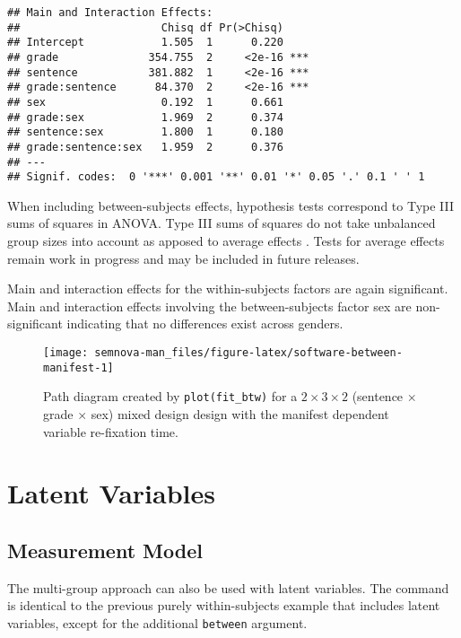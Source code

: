 \documentclass[
]{book}
\begin{document}
\begin{verbatim}
## Main and Interaction Effects:
##                      Chisq df Pr(>Chisq)    
## Intercept            1.505  1      0.220    
## grade              354.755  2     <2e-16 ***
## sentence           381.882  1     <2e-16 ***
## grade:sentence      84.370  2     <2e-16 ***
## sex                  0.192  1      0.661    
## grade:sex            1.969  2      0.374    
## sentence:sex         1.800  1      0.180    
## grade:sentence:sex   1.959  2      0.376    
## ---
## Signif. codes:  0 '***' 0.001 '**' 0.01 '*' 0.05 '.' 0.1 ' ' 1
\end{verbatim}

When including between-subjects effects, hypothesis tests correspond to Type III sums of squares in ANOVA. Type III sums of squares do not take unbalanced group sizes into account as apposed to average effects \citep[e.g.,][]{Graefe2020a}. Tests for average effects remain work in progress and may be included in future releases.

Main and interaction effects for the within-subjects factors are again significant. Main and interaction effects involving the between-subjects factor sex are non-significant indicating that no differences exist across genders.

\begin{figure}

{\centering \texttt{[image: semnova-man\_files/figure-latex/software-between-manifest-1]} 

}

\caption{Path diagram created by \texttt{plot(fit\_btw)} for a $2 \times 3 \times 2$ (sentence $\times$ grade $\times$ sex) mixed design design with the manifest dependent variable re-fixation time.}\label{fig:software-between-manifest}
\end{figure}

\hypertarget{latent-variables-1}{%
\section{Latent Variables}\label{latent-variables-1}}

\hypertarget{measurement-model-1}{%
\subsection{Measurement Model}\label{measurement-model-1}}

The multi-group approach can also be used with latent variables. The command is identical to the previous purely within-subjects example that includes latent variables, except for the additional \texttt{between} argument.
\end{document}
